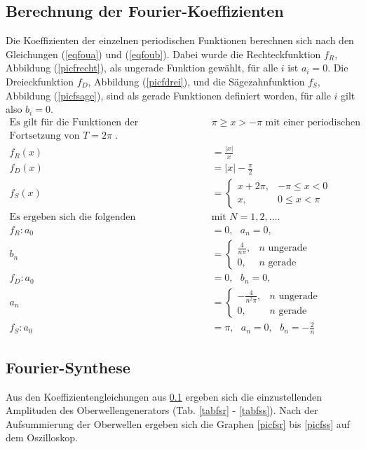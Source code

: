 \subsection{Berechnung der Fourier-Koeffizienten} \label{subsec:rechnen}
  
Die Koeffizienten der einzelnen periodischen Funktionen berechnen sich nach den 
Gleichungen (\ref{eqfoua}) und (\ref{eqfoub}). Dabei wurde die Rechteckfunktion 
$f_R$, Abbildung (\ref{picfrecht}), als ungerade Funktion gewählt, für alle $i$ ist $a_i=0$.
Die Dreieckfunktion $f_D$, Abbildung (\ref{picfdrei}), und die Sägezahnfunktion $f_S$,
Abbildung (\ref{picfsage}), sind als gerade Funktionen definiert worden, für alle $i$ gilt
also  $b_i=0$.
\begin{align}
\text{Es gilt für die Funktionen der Definitionsbereich }&\pi \ge x > -\pi \text{ mit einer periodischen} \nonumber \\
\text{Fortsetzung von }T=2\pi \text{ .}\nonumber \\
f_R(x)&=\frac{\left| x \right|}{x}\\
f_D(x)&=\left| x \right| - \frac{\pi}{2}\\
f_S(x)&=\begin{cases}
  x + 2 \pi,  & -\pi \le x < 0\\
  x, & 0 \le x < \pi
\end{cases}\\
\text{Es ergeben sich die folgenden Fourierkoeffizienten }&\text{mit $N=1,2, \ldots$.} \nonumber \\
f_R: a_0&=0,\text{ }a_n=0, \\
b_n&=\begin{cases}
	\frac{4}{n\pi}, & n \text{ ungerade}\\
	0, & n \text{ gerade}
\end{cases}\\
f_D: a_0&=0, \text{ }b_n=0,\\
a_n&=\begin{cases}
	-\frac{4}{n^2\pi}, & n \text{ ungerade}\\
	0, & n \text{ gerade}
\end{cases}\\
f_S: a_0&=\pi, \text{ }a_n=0, \text{ }b_n=-\frac{2}{n}
\end{align}
\subsection{Fourier-Synthese}
     
Aus den Koeffizientengleichungen aus \ref{subsec:rechnen} ergeben sich die einzustellenden Amplituden
des Oberwellengenerators (Tab. \ref{tabfsr} - \ref{tabfss}). Nach der Aufsummierung der Oberwellen
ergeben sich die Graphen \ref{picfsr} bis \ref{picfss} auf dem Oszilloskop.
\FloatBarrier
